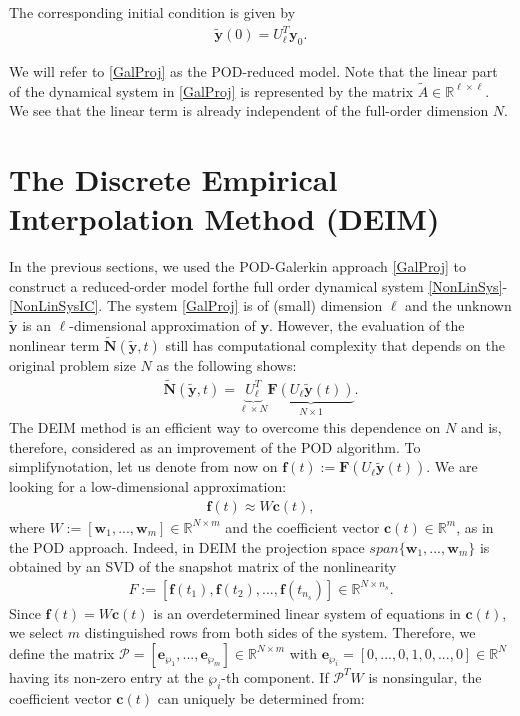 The corresponding initial condition is given by
\begin{align*}
\mathbf{\tilde y}(0) = U_\ell^T \mathbf{y}_0.
\end{align*}

We will refer to \eqref{GalProj} as the POD-reduced model. Note that the linear part of the dynamical system in \eqref{GalProj} is represented by the matrix $\tilde A \in \mathbb{R}^{\ell \times \ell}$. We see that the linear term is already independent of the full-order dimension $N$.
\section{The Discrete Empirical Interpolation Method (DEIM)}
\label{Deim_chap}
In the previous sections, we used the POD-Galerkin approach \eqref{GalProj} to construct a reduced-order model forthe full order dynamical system \eqref{NonLinSys}-\eqref{NonLinSysIC}. The system \eqref{GalProj} is of (small) dimension $\ell$ and the unknown $\mathbf{\tilde y}$ is an $\ell$-dimensional approximation of $\mathbf{y}$. However, the evaluation of the nonlinear term $\mathbf{\tilde N}(\mathbf{\tilde y},t)$ still has computational complexity that depends on the original problem size $N$ as the following shows:
\begin{align*}
\mathbf{\tilde N}(\mathbf{\tilde y},t) = \underbrace{U_\ell^T}_{\ell \times N} \underbrace{\mathbf{F}(U_\ell\mathbf{\tilde y}(t))}_{N \times 1}.
\end{align*}
The DEIM method \cite{DEIM} is an efficient way to overcome this dependence on $N$ and is, therefore, considered as an improvement of the POD algorithm. To simplifynotation, let us denote from now on $\mathbf{f}(t) := \mathbf{F}(U_\ell\mathbf{\tilde y}(t))$. We are looking for a low-dimensional approximation:
\begin{align*}
\mathbf{f}(t) \approx W \mathbf{c}(t),
\end{align*}
where $W := [\mathbf{w}_1,...,\mathbf{w}_m] \in \mathbb{R}^{N \times m}$ and the coefficient vector $\mathbf{c}(t) \in \mathbb{R}^m$, as in the POD approach. Indeed, in DEIM the projection space $span \{\mathbf{w}_1,...,\mathbf{w}_m\}$ is obtained by an SVD of the snapshot matrix of the nonlinearity
\begin{align}
\label{snapshotF}
F := [\mathbf{f}(t_1), \mathbf{f}(t_2), ..., \mathbf{f}(t_{n_s})] \in \mathbb{R}^{N \times n_s}.
\end{align}
Since $\mathbf{f}(t) = W \mathbf{c}(t)$ is an overdetermined linear system of equations in $\mathbf{c}(t)$, we select $m$ distinguished rows from both sides of the system. Therefore, we define the matrix $\mathcal{P} = [\mathbf{e}_{\wp_1},...,\mathbf{e}_{\wp_m}] \in \mathbb{R}^{N \times m}$ with $\mathbf{e}_{\wp_i} = [0,...,0,1,0,...,0] \in \mathbb{R}^N$ having its non-zero entry at the $\wp_i$-th component. If $\mathcal{P}^T W$ is nonsingular, the coefficient vector $\mathbf{c}(t)$ can uniquely be determined from:

